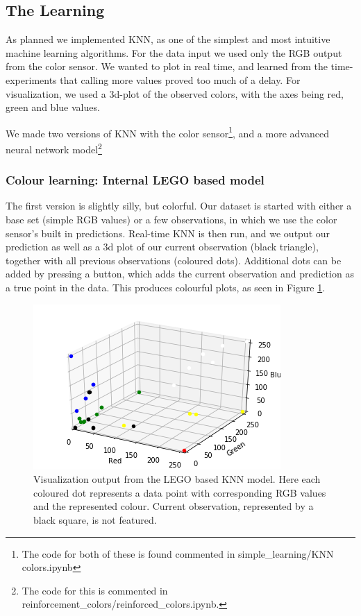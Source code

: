 \documentclass[11pt, a4paper]{article}
\begin{document}
\subsection{The Learning}
As planned we implemented KNN, as one of the simplest and most intuitive machine learning algorithms. For the data input we used only the RGB output from the color sensor. We wanted to plot in real time, and learned from the time-experiments that calling more values proved too much of a delay. For visualization, we used a 3d-plot of the observed colors, with the axes being red, green and blue values.

We made two versions of KNN with the color sensor\footnote{The code for both of these is found commented in simple\_learning/KNN colors.ipynb}, and a more advanced neural network model\footnote{The code for this is commented in reinforcement\_colors/reinforced\_colors.ipynb.}
\subsubsection{Colour learning: Internal LEGO based model}
The first version is slightly silly, but colorful. Our dataset is started with either a base set (simple RGB values) or a few observations, in which we use the color sensor's built in predictions. Real-time KNN is then run, and we output our prediction as well as a 3d plot of our current observation (black triangle), together with all previous observations (coloured dots). Additional dots can be added by pressing a button, which adds the current observation and prediction as a true point in the data. This produces colourful plots, as seen in Figure \ref{fig:colour_KNN_LEGO}.

\begin{figure}[H]
	\centering
	\includegraphics[scale=1]{images/ColourKNNversion1.png} 	
	\caption{Visualization output from the LEGO based KNN model. Here each coloured dot represents a data point with corresponding RGB values and the represented colour. Current observation, represented by a black square, is not featured.}
	\label{fig:colour_KNN_LEGO}
\end{figure}
\end{document}
